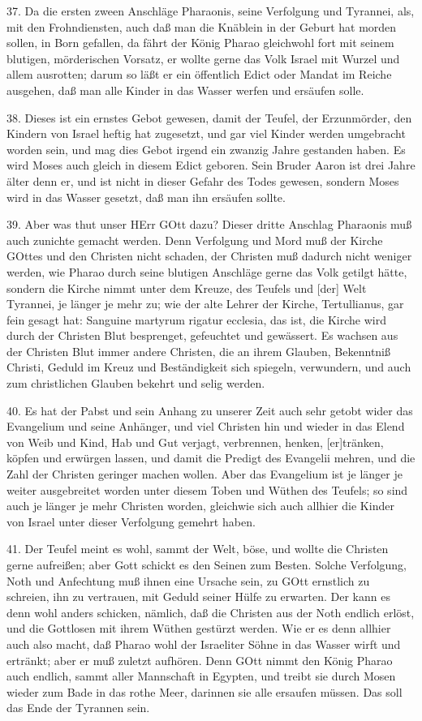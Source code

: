 37. Da die ersten zween Anschläge Pharaonis, seine Verfolgung und Tyrannei, als, mit den Frohndiensten, auch daß man die Knäblein in der Geburt hat morden sollen, in Born gefallen, da fährt der König Pharao gleichwohl fort mit seinem blutigen, mörderischen Vorsatz, er wollte gerne das Volk Israel mit Wurzel und allem ausrotten; darum so läßt er ein öffentlich Edict oder Mandat im Reiche ausgehen, daß man alle Kinder in das Wasser werfen und ersäufen solle.

38. Dieses ist ein ernstes Gebot gewesen, damit der Teufel, der Erzunmörder, den Kindern von Israel heftig hat zugesetzt, und gar viel Kinder werden umgebracht worden sein, und mag dies Gebot irgend ein zwanzig Jahre gestanden haben. Es wird Moses auch gleich in diesem Edict geboren. Sein Bruder Aaron ist drei Jahre älter denn er, und ist nicht in dieser Gefahr des Todes gewesen, sondern Moses wird in das Wasser gesetzt, daß man ihn ersäufen sollte.

39. Aber was thut unser HErr GOtt dazu? Dieser dritte Anschlag Pharaonis muß auch zunichte gemacht werden. Denn Verfolgung und Mord muß der Kirche GOttes und den Christen nicht schaden, der Christen muß dadurch nicht weniger werden, wie Pharao durch seine blutigen Anschläge gerne das Volk getilgt hätte, sondern die Kirche nimmt unter dem Kreuze, des
Teufels und [der] Welt Tyrannei, je länger je mehr zu; wie der alte Lehrer der Kirche, Tertullianus, gar fein gesagt hat: Sanguine martyrum rigatur ecclesia, das ist, die Kirche wird durch der Christen Blut besprenget, gefeuchtet und gewässert. Es wachsen aus der Christen Blut immer andere Christen, die an ihrem Glauben, Bekenntniß Christi, Geduld im Kreuz und Beständigkeit sich spiegeln, verwundern, und auch zum christlichen Glauben bekehrt und selig werden.

40. Es hat der Pabst und sein Anhang zu unserer Zeit auch sehr getobt wider das Evangelium und seine Anhänger, und viel Christen hin und wieder in das Elend von Weib und Kind, Hab und Gut verjagt, verbrennen, henken, [er]tränken, köpfen und erwürgen lassen, und damit die Predigt des Evangelii mehren, und die Zahl der Christen geringer machen wollen. Aber das Evangelium ist je länger je weiter ausgebreitet worden unter diesem Toben und Wüthen des Teufels; so sind auch je länger je mehr Christen worden, gleichwie sich auch allhier die Kinder von Israel unter dieser Verfolgung gemehrt haben.

41. Der Teufel meint es wohl, sammt der Welt, böse, und wollte die Christen gerne aufreißen; aber Gott schickt es den Seinen zum Besten. Solche Verfolgung, Noth und Anfechtung muß ihnen eine Ursache sein, zu GOtt ernstlich zu schreien, ihn zu vertrauen, mit Geduld seiner Hülfe zu erwarten. Der kann es denn wohl anders schicken, nämlich, daß die Christen aus der Noth endlich erlöst, und die Gottlosen mit ihrem Wüthen gestürzt werden. Wie er es denn allhier auch also macht, daß Pharao wohl der Israeliter Söhne in das Wasser wirft und ertränkt; aber er muß zuletzt aufhören. Denn GOtt nimmt den König Pharao auch endlich, sammt aller Mannschaft in Egypten, und treibt sie durch Mosen wieder zum Bade in das rothe Meer, darinnen sie alle ersaufen müssen. Das soll das Ende der Tyrannen sein.

